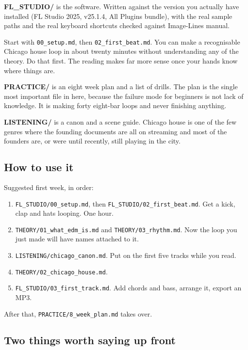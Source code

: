 \textbf{FL\_STUDIO/} is the software. Written against the version you actually have installed
(FL Studio 2025, v25.1.4, All Plugins bundle), with the real sample paths and the real
keyboard shortcuts checked against Image-Line\textquotesingle s manual.

Start with \texttt{00\_setup.md}, then \texttt{02\_first\_beat.md}. You can make a recognisable Chicago
house loop in about twenty minutes without understanding any of the theory. Do that first.
The reading makes far more sense once your hands know where things are.

\textbf{PRACTICE/} is an eight week plan and a list of drills. The plan is the single most
important file in here, because the failure mode for beginners is not lack of knowledge.
It is making forty eight-bar loops and never finishing anything.

\textbf{LISTENING/} is a canon and a scene guide. Chicago house is one of the few genres where
the founding documents are all on streaming and most of the founders are, or were until
recently, still playing in the city.

\subsection{How to use it}\label{00_how_to_use-how-to-use-it}

Suggested first week, in order:

\begin{enumerate}
\def\labelenumi{\arabic{enumi}.}
\tightlist
\item
  \texttt{FL\_STUDIO/00\_setup.md}, then \texttt{FL\_STUDIO/02\_first\_beat.md}. Get a kick, clap and hats
  looping. One hour.
\item
  \texttt{THEORY/01\_what\_edm\_is.md} and \texttt{THEORY/03\_rhythm.md}. Now the loop you just made will
  have names attached to it.
\item
  \texttt{LISTENING/chicago\_canon.md}. Put on the first five tracks while you read.
\item
  \texttt{THEORY/02\_chicago\_house.md}.
\item
  \texttt{FL\_STUDIO/03\_first\_track.md}. Add chords and bass, arrange it, export an MP3.
\end{enumerate}

After that, \texttt{PRACTICE/8\_week\_plan.md} takes over.

\subsection{Two things worth saying up front}\label{00_how_to_use-two-things-worth-saying-up-front}

